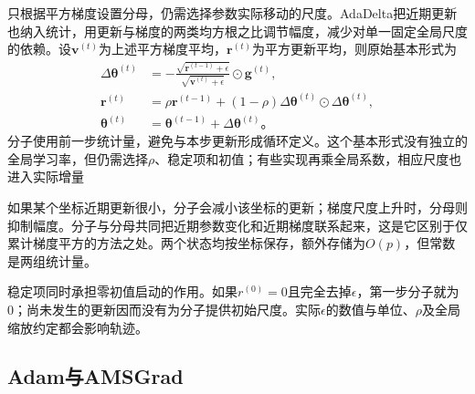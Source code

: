 只根据平方梯度设置分母，仍需选择参数实际移动的尺度。AdaDelta把近期更新也纳入统计，用更新与梯度的两类均方根之比调节幅度，减少对单一固定全局尺度的依赖。设$\bm v^{(t)}$为上述平方梯度平均，$\bm r^{(t)}$为平方更新平均，则原始基本形式为
\begin{align}
  \Delta\bm\theta^{(t)}&=-\frac{\sqrt{\bm r^{(t-1)}+\epsilon}}
                               {\sqrt{\bm v^{(t)}+\epsilon}}
                                \odot\bm g^{(t)},\\
  \bm r^{(t)}&=\rho\bm r^{(t-1)}+(1-\rho)
      \Delta\bm\theta^{(t)}\odot\Delta\bm\theta^{(t)},\\
  \bm\theta^{(t)}&=\bm\theta^{(t-1)}+\Delta\bm\theta^{(t)}\text{。}
  \label{eq:training-adadelta}
\end{align}
分子使用前一步统计量，避免与本步更新形成循环定义。这个基本形式没有独立的全局学习率，但仍需选择$\rho$、稳定项和初值；有些实现再乘全局系数，相应尺度也进入实际增量

如果某个坐标近期更新很小，分子会减小该坐标的更新；梯度尺度上升时，分母则抑制幅度。分子与分母共同把近期参数变化和近期梯度联系起来，这是它区别于仅累计梯度平方的方法之处。两个状态均按坐标保存，额外存储为$O(p)$，但常数是两组统计量。

稳定项同时承担零初值启动的作用。如果$r^{(0)}=0$且完全去掉$\epsilon$，第一步分子就为0；尚未发生的更新因而没有为分子提供初始尺度。实际$\epsilon$的数值与单位、$\rho$及全局缩放约定都会影响轨迹。

\subsection{Adam与AMSGrad}
\label{sec:training-adam}

